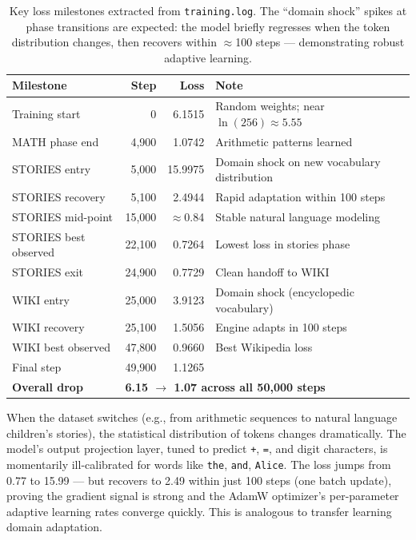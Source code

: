 \documentclass[12pt, a4paper]{article}
\begin{document}
\begin{table}[!ht]
\centering
\renewcommand{\arraystretch}{1.3}
\begin{tabular}{@{} l r r l @{}}
\toprule
\textbf{Milestone} & \textbf{Step} & \textbf{Loss} & \textbf{Note} \\
\midrule
Training start        &      0 & 6.1515 & Random weights; near $\ln(256) \approx 5.55$ \\
MATH phase end        &  4,900 & 1.0742 & Arithmetic patterns learned \\
STORIES entry         &  5,000 & 15.9975 & Domain shock on new vocabulary distribution \\
STORIES recovery      &  5,100 & 2.4944  & Rapid adaptation within 100 steps \\
STORIES mid-point     & 15,000 & $\approx$0.84 & Stable natural language modeling \\
STORIES best observed & 22,100 & 0.7264 & Lowest loss in stories phase \\
STORIES exit          & 24,900 & 0.7729 & Clean handoff to WIKI \\
WIKI entry            & 25,000 & 3.9123 & Domain shock (encyclopedic vocabulary) \\
WIKI recovery         & 25,100 & 1.5056 & Engine adapts in 100 steps \\
WIKI best observed    & 47,800 & 0.9660 & Best Wikipedia loss \\
Final step            & 49,900 & 1.1265 & \\
\midrule
\textbf{Overall drop} & \multicolumn{3}{l}{\textbf{6.15 $\to$ 1.07 across all 50,000 steps}} \\
\bottomrule
\end{tabular}
\caption{Key loss milestones extracted from \texttt{training.log}. The ``domain shock'' spikes at phase transitions are expected: the model briefly regresses when the token distribution changes, then recovers within $\approx$100 steps --- demonstrating robust adaptive learning.}
\end{table}

\begin{tcolorbox}[interviewbox,
    title={Interview: Why does loss spike at phase transitions?}]
  When the dataset switches (e.g., from arithmetic sequences to natural language
  children's stories), the statistical distribution of tokens changes
  dramatically.  The model's output projection layer, tuned to predict
  \texttt{+}, \texttt{=}, and digit characters, is momentarily ill-calibrated
  for words like \texttt{the}, \texttt{and}, \texttt{Alice}.
  The loss jumps from 0.77 to 15.99 --- but recovers to 2.49 within
  just 100 steps (one batch update), proving the gradient signal is strong and
  the AdamW optimizer's per-parameter adaptive learning rates converge quickly.
  This is analogous to transfer learning domain adaptation.
\end{tcolorbox}
\end{document}
